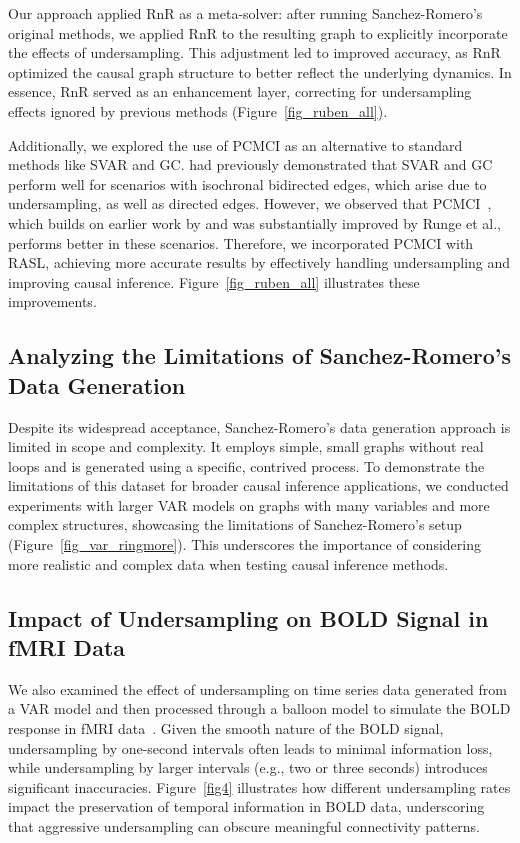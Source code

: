 Our approach applied RnR as a meta-solver: after running Sanchez-Romero’s original methods, we applied RnR to the resulting graph to explicitly incorporate the effects of undersampling. This adjustment led to improved accuracy, as RnR optimized the causal graph structure to better reflect the underlying dynamics. In essence, RnR served as an enhancement layer, correcting for undersampling effects ignored by previous methods (Figure~\ref{fig_ruben_all}).

Additionally, we explored the use of PCMCI as an alternative to standard methods like SVAR and GC. \cite{cook2017learning} had previously demonstrated that SVAR and GC perform well for scenarios with isochronal bidirected edges, which arise due to undersampling, as well as directed edges. However, we observed that PCMCI~\citep{pcmci}, which builds on earlier work by \citet{moneta2011causal} and was substantially improved by Runge et al., performs better in these scenarios. Therefore, we incorporated PCMCI with RASL, achieving more accurate results by effectively handling undersampling and improving causal inference. Figure~\ref{fig_ruben_all} illustrates these improvements.





\subsection{Analyzing the Limitations of Sanchez-Romero's Data Generation}

Despite its widespread acceptance, Sanchez-Romero's data generation approach is limited in scope and complexity. It employs simple, small graphs without real loops and is generated using a specific, contrived process. To demonstrate the limitations of this dataset for broader causal inference applications, we conducted experiments with larger VAR models on graphs with many variables and more complex structures, showcasing the limitations of Sanchez-Romero's setup (Figure~\ref{fig_var_ringmore}). This underscores the importance of considering more realistic and complex data when testing causal inference methods.





\subsection{Impact of Undersampling on BOLD Signal in fMRI Data}

We also examined the effect of undersampling on time series data generated from a VAR model and then processed through a balloon model to simulate the BOLD response in fMRI data~\citep{buxton1998dynamics}. Given the smooth nature of the BOLD signal, undersampling by one-second intervals often leads to minimal information loss, while undersampling by larger intervals (e.g., two or three seconds) introduces significant inaccuracies. Figure~\ref{fig4} illustrates how different undersampling rates impact the preservation of temporal information in BOLD data, underscoring that aggressive undersampling can obscure meaningful connectivity patterns.






